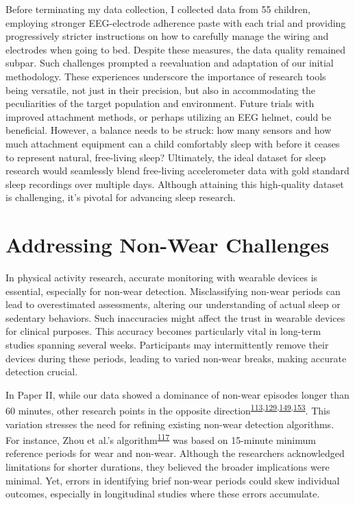 \documentclass[
  10pt,
]{scrbook}
\begin{document}
Before terminating my data collection, I collected data from 55
children, employing stronger EEG-electrode adherence paste with each
trial and providing progressively stricter instructions on how to
carefully manage the wiring and electrodes when going to bed. Despite
these measures, the data quality remained subpar. Such challenges
prompted a reevaluation and adaptation of our initial methodology. These
experiences underscore the importance of research tools being versatile,
not just in their precision, but also in accommodating the peculiarities
of the target population and environment. Future trials with improved
attachment methods, or perhaps utilizing an EEG helmet, could be
beneficial. However, a balance needs to be struck: how many sensors and
how much attachment equipment can a child comfortably sleep with before
it ceases to represent natural, free-living sleep? Ultimately, the ideal
dataset for sleep research would seamlessly blend free-living
accelerometer data with gold standard sleep recordings over multiple
days. Although attaining this high-quality dataset is challenging, it's
pivotal for advancing sleep research.

\hypertarget{addressing-non-wear-challenges}{%
\section{Addressing Non-Wear
Challenges}\label{addressing-non-wear-challenges}}

In physical activity research, accurate monitoring with wearable devices
is essential, especially for non-wear detection. Misclassifying non-wear
periods can lead to overestimated assessments, altering our
understanding of actual sleep or sedentary behaviors. Such inaccuracies
might affect the trust in wearable devices for clinical purposes. This
accuracy becomes particularly vital in long-term studies spanning
several weeks. Participants may intermittently remove their devices
during these periods, leading to varied non-wear breaks, making accurate
detection crucial.

In Paper II, while our data showed a dominance of non-wear episodes
longer than 60 minutes, other research points in the opposite
direction\textsuperscript{\protect\hyperlink{ref-aadland_comparison_2018}{113},\protect\hyperlink{ref-jaeschke_variability_2018}{129},\protect\hyperlink{ref-hutto_identifying_2013}{149},\protect\hyperlink{ref-vert_detecting_2022}{153}}.
This variation stresses the need for refining existing non-wear
detection algorithms. For instance, Zhou et al.'s
algorithm\textsuperscript{\protect\hyperlink{ref-zhou_classification_2015}{117}}
was based on 15-minute minimum reference periods for wear and non-wear.
Although the researchers acknowledged limitations for shorter durations,
they believed the broader implications were minimal. Yet, errors in
identifying brief non-wear periods could skew individual outcomes,
especially in longitudinal studies where these errors accumulate.
\end{document}
